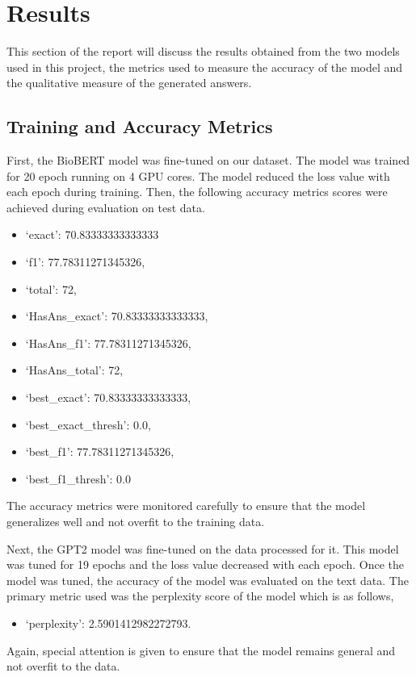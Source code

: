\section*{Results}
	This section of the report will discuss the results obtained from the two models used in this project, the metrics used to measure the accuracy of the model and the qualitative measure of the generated answers.
	
	\subsection*{Training and Accuracy Metrics}
		First, the BioBERT model was fine-tuned on our dataset. The model was trained for 20 epoch running on 4 GPU cores. The model reduced the loss value with each epoch during training. Then, the following accuracy metrics scores were achieved during evaluation on test data.
		\begin{itemize}
			\item `exact': 70.83333333333333
			\item `f1': 77.78311271345326,
			\item `total': 72,
			\item `HasAns\_exact': 70.83333333333333,
			\item `HasAns\_f1': 77.78311271345326,
			\item `HasAns\_total': 72,
			\item `best\_exact': 70.83333333333333,
			\item `best\_exact\_thresh': 0.0,
			\item `best\_f1': 77.78311271345326,
			\item `best\_f1\_thresh': 0.0
		\end{itemize}
		The accuracy metrics were monitored carefully to ensure that the model generalizes well and not overfit to the training data.
		
		Next, the GPT2 model was fine-tuned on the data processed for it. This model was tuned for 19 epochs and the loss value decreased with each epoch. Once the model was tuned,  the accuracy of the model was evaluated on the text data. The primary metric used was the perplexity score of the model which is as follows,
		\begin{itemize}
			\item `perplexity': 2.5901412982272793.
		\end{itemize} 
		Again, special attention is given to ensure that the model remains general and not overfit to the data. 
		
